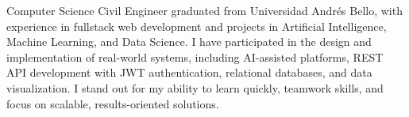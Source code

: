 

\begin{cvparagraph}

Computer Science Civil Engineer graduated from Universidad Andrés Bello, with experience in fullstack web development and projects in Artificial Intelligence, Machine Learning, and Data Science. I have participated in the design and implementation of real-world systems, including AI-assisted platforms, REST API development with JWT authentication, relational databases, and data visualization. I stand out for my ability to learn quickly, teamwork skills, and focus on scalable, results-oriented solutions.
\end{cvparagraph}
